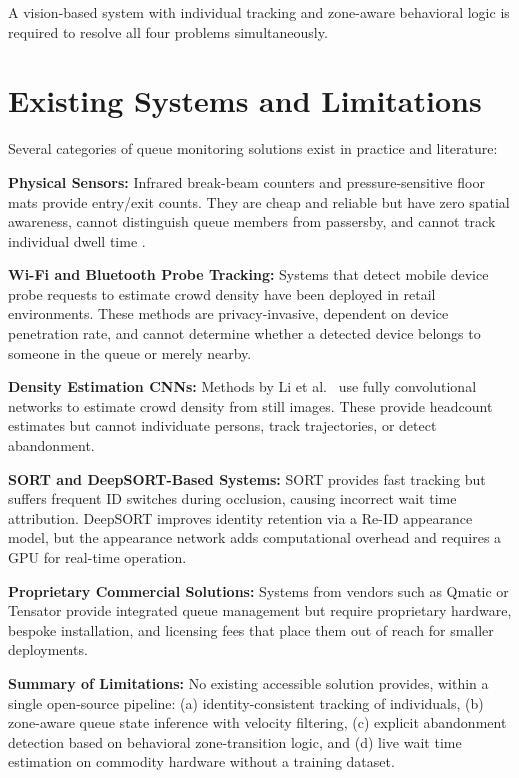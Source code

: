 \documentclass[journal, twocolumn]{IEEEtran}
\begin{document}
A vision-based system with individual tracking and zone-aware behavioral logic is required to resolve all four problems simultaneously.

\section{Existing Systems and Limitations}
\label{sec:existing}

Several categories of queue monitoring solutions exist in practice and literature:

\textbf{Physical Sensors:} Infrared break-beam counters and pressure-sensitive floor mats provide entry/exit counts. They are cheap and reliable but have zero spatial awareness, cannot distinguish queue members from passersby, and cannot track individual dwell time \cite{szeliski2022}.

\textbf{Wi-Fi and Bluetooth Probe Tracking:} Systems that detect mobile device probe requests to estimate crowd density have been deployed in retail environments. These methods are privacy-invasive, dependent on device penetration rate, and cannot determine whether a detected device belongs to someone in the queue or merely nearby.

\textbf{Density Estimation CNNs:} Methods by Li et al.\ \cite{li2018fully} use fully convolutional networks to estimate crowd density from still images. These provide headcount estimates but cannot individuate persons, track trajectories, or detect abandonment.

\textbf{SORT and DeepSORT-Based Systems:} SORT \cite{sort2016} provides fast tracking but suffers frequent ID switches during occlusion, causing incorrect wait time attribution. DeepSORT \cite{deepsort2017} improves identity retention via a Re-ID appearance model, but the appearance network adds computational overhead and requires a GPU for real-time operation.

\textbf{Proprietary Commercial Solutions:} Systems from vendors such as Qmatic or Tensator provide integrated queue management but require proprietary hardware, bespoke installation, and licensing fees that place them out of reach for smaller deployments.

\textbf{Summary of Limitations:} No existing accessible solution provides, within a single open-source pipeline: (a) identity-consistent tracking of individuals, (b) zone-aware queue state inference with velocity filtering, (c) explicit abandonment detection based on behavioral zone-transition logic, and (d) live wait time estimation on commodity hardware without a training dataset.
\end{document}
